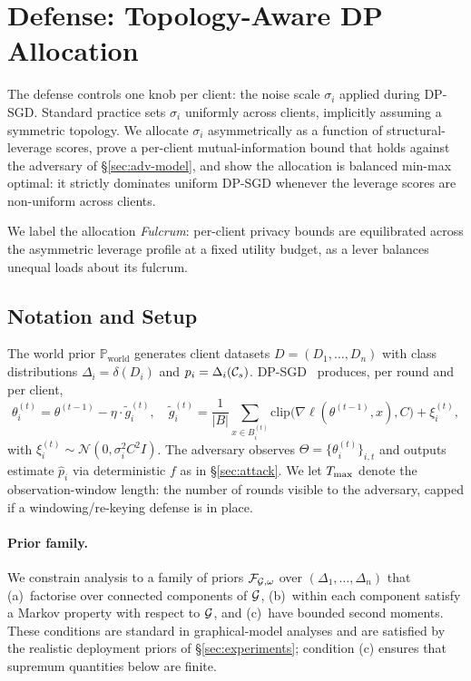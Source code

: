 \section{Defense: Topology-Aware DP Allocation}
\label{sec:defense}

The defense controls one knob per client: the noise scale $\sigma_i$
applied during DP-SGD. Standard practice sets $\sigma_i$ uniformly
across clients, implicitly assuming a symmetric topology. We allocate
$\sigma_i$ asymmetrically as a function of structural-leverage scores,
prove a per-client mutual-information bound that holds against the
adversary of \S\ref{sec:adv-model}, and show the allocation is balanced
min-max optimal: it strictly dominates uniform DP-SGD whenever the
leverage scores are non-uniform across clients.

We label the allocation \emph{Fulcrum}: per-client privacy bounds are
equilibrated across the asymmetric leverage profile at a fixed utility
budget, as a lever balances unequal loads about its fulcrum.

\subsection{Notation and Setup}
\label{sec:defense-setup}

The world prior $\mathbb{P}_{\mathrm{world}}$ generates client datasets
$D = (D_1,\ldots,D_n)$ with class distributions $\Delta_i = \delta(D_i)$
and $p_i = \Delta_i(\mathcal{C}_{s})$. DP-SGD~\cite{abadi2016dpsgd} produces, per
round and per client,
\begin{equation}
\theta_i^{(t)} = \theta^{(t-1)} - \eta \cdot \tilde g_i^{(t)},
\quad
\tilde g_i^{(t)} = \frac{1}{|B|}\sum_{x \in B_i^{(t)}} \mathrm{clip}\big(\nabla\ell(\theta^{(t-1)},x), C\big) + \xi_i^{(t)},
\label{eq:dpsgd}
\end{equation}
with $\xi_i^{(t)} \sim \mathcal{N}(0, \sigma_i^2 C^2 I)$. The adversary
observes $\Theta = \{\theta_i^{(t)}\}_{i,t}$ and outputs estimate
$\hat p_i$ via deterministic $f$ as in \S\ref{sec:attack}. We let
$T_{\max}$ denote the observation-window length: the number of rounds
visible to the adversary, capped if a windowing/re-keying defense is in
place.

\paragraph{Prior family.} We constrain analysis to a family of priors
$\mathcal{F}_{\mathcal{G},\omega}$ over $(\Delta_1,\ldots,\Delta_n)$ that
(a)~factorise over connected components of $\mathcal{G}$, (b)~within each
component satisfy a Markov property with respect to $\mathcal{G}$, and
(c)~have bounded second moments. These conditions are standard in
graphical-model analyses and are satisfied by the realistic deployment
priors of \S\ref{sec:experiments}; condition (c) ensures that supremum
quantities below are finite.

